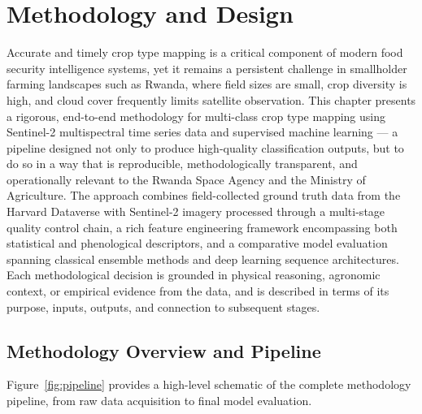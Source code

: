 
\chapter{Methodology and Design}
\label{ch:method}

Accurate and timely crop type mapping is a critical component of modern
food security intelligence systems, yet it remains a persistent challenge
in smallholder farming landscapes such as Rwanda, where field sizes are
small, crop diversity is high, and cloud cover frequently limits satellite
observation. This chapter presents a rigorous, end-to-end methodology for
multi-class crop type mapping using Sentinel-2 multispectral time series
data and supervised machine learning — a pipeline designed not only to
produce high-quality classification outputs, but to do so in a way that
is reproducible, methodologically transparent, and operationally relevant
to the Rwanda Space Agency and the Ministry of Agriculture. The approach
combines field-collected ground truth data from the Harvard Dataverse with
Sentinel-2 imagery processed through a multi-stage quality control chain,
a rich feature engineering framework encompassing both statistical and
phenological descriptors, and a comparative model evaluation spanning
classical ensemble methods and deep learning sequence architectures. Each
methodological decision is grounded in physical reasoning, agronomic
context, or empirical evidence from the data, and is described in terms
of its purpose, inputs, outputs, and connection to subsequent stages.


\section{Methodology Overview and Pipeline}
\label{sec:pipeline}

Figure~\ref{fig:pipeline} provides a high-level schematic of the complete
methodology pipeline, from raw data acquisition to final model evaluation.

